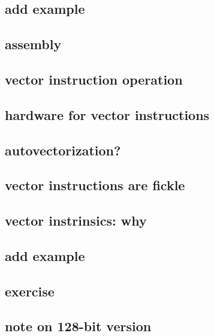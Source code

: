 \subsection{add example}


\subsection{assembly}


\subsection{vector instruction operation}


\subsection{hardware for vector instructions}


\subsection{autovectorization?}


\subsection{vector instructions are fickle}


\subsection{vector instrinsics: why}


\subsection{add example}



\subsection{exercise}


\subsection{note on 128-bit version}


